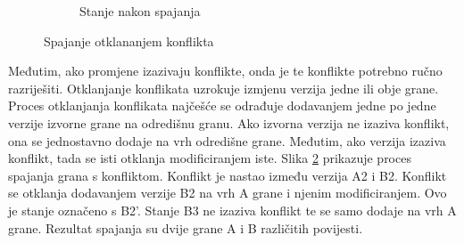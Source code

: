 \documentclass[times, utf8, diplomski, numeric]{fer}
\begin{document}
\begin{figure}
\begin{subfigure}{.49\textwidth}
\caption{Stanje nakon spajanja}
\label{fig:ConflictB}
\end{subfigure}
\caption{Spajanje otklananjem konflikta}
\label{fig:Conflict}
\end{figure}

Međutim, ako promjene izazivaju konflikte, onda je te konflikte potrebno ručno razriješiti. Otklanjanje konflikata uzrokuje izmjenu verzija jedne ili obje grane. Proces otklanjanja konflikata najčešće se odrađuje dodavanjem jedne po jedne verzije izvorne grane na odredišnu granu. Ako izvorna verzija ne izaziva konflikt, ona se jednostavno dodaje na vrh odredišne grane. Međutim, ako verzija izaziva konflikt, tada se isti otklanja modificiranjem iste. Slika \ref{fig:Conflict} prikazuje proces spajanja grana s konfliktom. Konflikt je nastao između verzija A2 i B2. Konflikt se otklanja dodavanjem verzije B2 na vrh A grane i njenim modificiranjem. Ovo je stanje označeno s B2'. Stanje B3 ne izaziva konflikt te se samo dodaje na vrh A grane. Rezultat spajanja su dvije grane A i B različitih povijesti.
\end{document}
